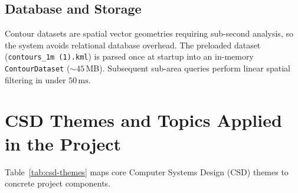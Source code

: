 \documentclass[manuscript,screen,review]{acmart}
\begin{document}
\subsection{Database and Storage}
Contour datasets are spatial vector geometries requiring sub-second analysis, so the system avoids relational database overhead. The preloaded dataset (\texttt{contours\_1m (1).kml}) is parsed once at startup into an in-memory \texttt{ContourDataset} (${\sim}45$\,MB). Subsequent sub-area queries perform linear spatial filtering in under $50\,\text{ms}$.

\section{CSD Themes and Topics Applied in the Project}
\label{sec:csd-themes}
Table~\ref{tab:csd-themes} maps core Computer Systems Design (CSD) themes to concrete project components.
\end{document}
